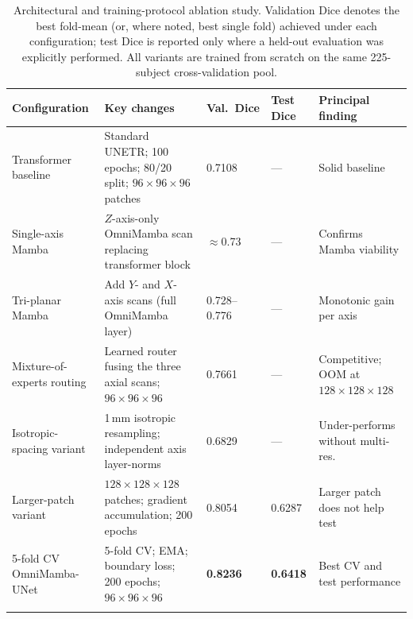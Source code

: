 \documentclass[pdflatex,sn-mathphys-num]{sn-jnl}
\begin{document}
\begin{table}[t]
\caption{Architectural and training-protocol ablation study. Validation
Dice denotes the best fold-mean (or, where noted, best single fold)
achieved under each configuration; test Dice is reported only where a
held-out evaluation was explicitly performed. All variants are trained
from scratch on the same 225-subject cross-validation pool.}
\label{tab:ablation}
\centering
\small
\begin{tabular}{@{}p{2.6cm}p{4.3cm}p{1.3cm}p{1.1cm}p{3.0cm}@{}}
\toprule
Configuration & Key changes & Val.\ Dice & Test Dice & Principal finding \\
\midrule
Transformer baseline &
Standard UNETR; 100 epochs; 80/20 split; $96 \times 96 \times 96$ patches &
0.7108 & --- & Solid baseline \\
\midrule
Single-axis Mamba &
$Z$-axis-only OmniMamba scan replacing transformer block &
$\approx$0.73 & --- & Confirms Mamba viability \\
\midrule
Tri-planar Mamba &
Add $Y$- and $X$-axis scans (full OmniMamba layer) &
0.728--0.776 & --- & Monotonic gain per axis \\
\midrule
Mixture-of-experts routing &
Learned router fusing the three axial scans; $96 \times 96 \times 96$ &
0.7661 & --- & Competitive; OOM at $128 \times 128 \times 128$ \\
\midrule
Isotropic-spacing variant &
1\,mm isotropic resampling; independent axis layer-norms &
0.6829 & --- & Under-performs without multi-res. \\
\midrule
Larger-patch variant &
$128 \times 128 \times 128$ patches; gradient accumulation; 200 epochs &
0.8054 & 0.6287 & Larger patch does not help test \\
\midrule
5-fold CV OmniMamba-UNet &
5-fold CV; EMA; boundary loss; 200 epochs; $96 \times 96 \times 96$ &
\textbf{0.8236} & \textbf{0.6418} & Best CV and test performance \\
\botrule
\end{tabular}
\end{table}
\end{document}
